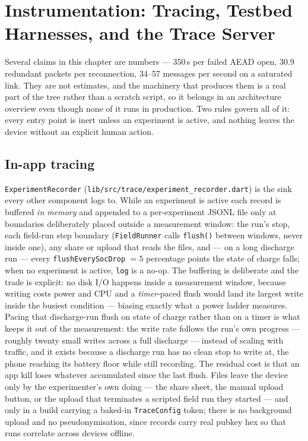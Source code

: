 \documentclass[11pt]{report}
\newcommand{\code}[1]{\texttt{\small #1}}
\begin{document}
\section{Instrumentation: Tracing, Testbed Harnesses, and the Trace Server}

Several claims in this chapter are numbers --- 350\,\textmu s per failed AEAD open, 30.9 redundant packets per reconnection, 34--57 messages per second on a saturated link. They are not estimates, and the machinery that produces them is a real part of the tree rather than a scratch script, so it belongs in an architecture overview even though none of it runs in production. Two rules govern all of it: every entry point is inert unless an experiment is active, and nothing leaves the device without an explicit human action.

\subsection{In-app tracing}

\code{ExperimentRecorder} (\code{lib/src/trace/experiment_recorder.dart}) is the sink every other component logs to. While an experiment is active each record is buffered \emph{in memory} and appended to a per-experiment JSONL file only at boundaries deliberately placed outside a measurement window: the run's stop, each field-run step boundary (\code{FieldRunner} calls \code{flush()} between windows, never inside one), any share or upload that reads the files, and --- on a long discharge run --- every \code{flushEverySocDrop} $=5$ percentage points the state of charge falls; when no experiment is active, \code{log} is a no-op. The buffering is deliberate and the trade is explicit: no disk I/O happens inside a measurement window, because writing costs power and CPU and a \emph{timer}-paced flush would land its largest write inside the busiest condition --- biasing exactly what a power ladder measures. Pacing that discharge-run flush on state of charge rather than on a timer is what keeps it out of the measurement: the write rate follows the run's own progress --- roughly twenty small writes across a full discharge --- instead of scaling with traffic, and it exists because a discharge run has no clean stop to write at, the phone reaching its battery floor while still recording. The residual cost is that an app kill loses whatever accumulated since the last flush. Files leave the device only by the experimenter's own doing --- the share sheet, the manual upload button, or the upload that terminates a scripted field run they started --- and only in a build carrying a baked-in \code{TraceConfig} token; there is no background upload and no pseudonymisation, since records carry real pubkey hex so that runs correlate across devices offline.
\end{document}
